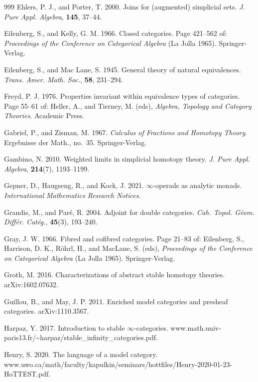 \begin{thebibliography}{999}
 Ehlers, P. J., and Porter, T. 2000. Joins for (augmented)
  simplicial sets. \emph{J. Pure Appl. Algebra}, \textbf{145}, 37--44.

 Eilenberg, S., and Kelly, G. M. 1966. Closed categories. Page
  421--562 of: \emph{Proceedings of the Conference on Categorical Algebra}
  (La Jolla 1965). Springer-Verlag.

 Eilenberg, S., and Mac Lane, S. 1945. General theory of natural
  equivalences. \emph{Trans. Amer. Math. Soc.}, \textbf{58}, 231--294.

 Freyd, P. J. 1976. Properties invariant within equivalence types
  of categories. Page 55--61 of: Heller, A., and Tierney, M. (eds),
  \emph{Algebra, Topology and Category Theories}. Academic Press.

 Gabriel, P., and Zisman, M. 1967. \emph{Calculus of Fractions and
  Homotopy Theory}. Ergebnisse der Math., no.~35. Springer-Verlag.

 Gambino, N. 2010. Weighted limits in simplicial homotopy theory.
  \emph{J. Pure Appl. Algebra}, \textbf{214}(7), 1193--1199.

 Gepner, D., Haugseng, R., and Kock, J. 2021. $\infty$-operads as
  analytic monads. \emph{International Mathematics Research Notices}.

 Grandis, M., and Paré, R. 2004. Adjoint for double categories.
  \emph{Cah. Topol. Géom. Différ. Catég.}, \textbf{45}(3), 193--240.

 Gray, J. W. 1966. Fibred and cofibred categories. Page 21--83
  of: Eilenberg, S., Harrison, D. K., Röhrl, H., and MacLane, S. (eds),
  \emph{Proceedings of the Conference on Categorical Algebra} (La Jolla 1965).
  Springer-Verlag.

 Groth, M. 2016. Characterizations of abstract stable homotopy
  theories. arXiv:1602.07632.

 Guillou, B., and May, J. P. 2011. Enriched model categories and
  presheaf categories. arXiv:1110.3567.

 Harpaz, Y. 2017. Introduction to stable $\infty$-categories.
  www.math.univ-paris13.fr/\textasciitilde{}harpaz/stable\_infinity\_categories.pdf.

 Henry, S. 2020. The language of a model category.
  www.uwo.ca/math/faculty/kapulkin/seminars/hottfiles/Henry-2020-01-23-HoTTEST.pdf.


\end{thebibliography}
